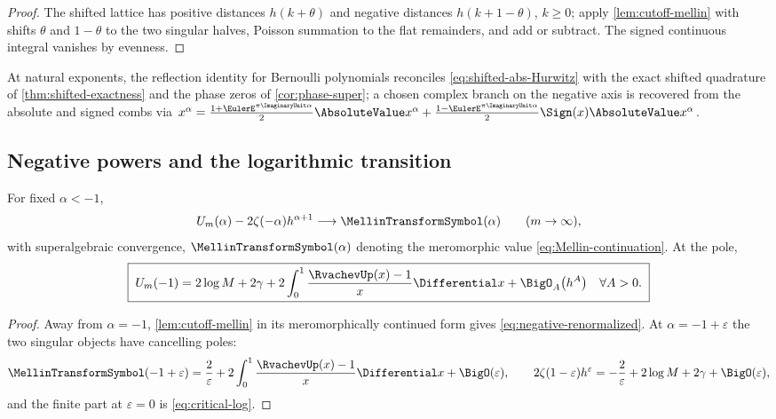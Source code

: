 \documentclass[11pt,oneside]{article}
\numberwithin{equation}{section}
\theoremstyle{definition}
\theoremstyle{remark}
\newcommand{\eps}{\varepsilon}
\begin{document}
\begin{proof}
The shifted lattice has positive distances $h(k+\theta)$ and negative
distances $h(k+1-\theta)$, $k\ge0$; apply \cref{lem:cutoff-mellin}
with shifts $\theta$ and $1-\theta$ to the two singular halves,
Poisson summation to the flat remainders, and add or subtract.  The
signed continuous integral vanishes by evenness.
\end{proof}

At natural exponents, the reflection identity for Bernoulli
polynomials reconciles \eqref{eq:shifted-abs-Hurwitz} with the exact
shifted quadrature of \cref{thm:shifted-exactness} and the phase
zeros of \cref{cor:phase-super}; a chosen complex branch on the
negative axis is recovered from the absolute and signed combs via
$x^{\alpha}
=\tfrac{1+\EulerE^{\pi\ImaginaryUnit\alpha}}2\AbsoluteValue x^{\alpha}
+\tfrac{1-\EulerE^{\pi\ImaginaryUnit\alpha}}2\Sign(x)\AbsoluteValue x^{\alpha}$.

\subsection{Negative powers and the logarithmic transition}

\begin{proposition}
\label{prop:negative-powers}
For fixed $\alpha<-1$,
\begin{equation}
 U_m(\alpha)-2\zeta(-\alpha)h^{\alpha+1}
 \longrightarrow \MellinTransformSymbol(\alpha)
 \qquad(m\to\infty),
 \label{eq:negative-renormalized}
\end{equation}
with superalgebraic convergence, $\MellinTransformSymbol(\alpha)$ denoting the
meromorphic value \eqref{eq:Mellin-continuation}.  At the pole,
\begin{equation}
 \boxed{\;
 U_m(-1)
 =2\log M+2\gamma
 +2\int_0^1\frac{\RvachevUp(x)-1}{x}\Differential x
 +\BigO_A\bigl(h^{A}\bigr)
 \quad\forall A>0.
 \;}
 \label{eq:critical-log}
\end{equation}
\end{proposition}

\begin{proof}
Away from $\alpha=-1$, \cref{lem:cutoff-mellin} in its meromorphically
continued form gives \eqref{eq:negative-renormalized}.  At
$\alpha=-1+\eps$ the two singular objects have cancelling poles:
\[
 \MellinTransformSymbol(-1+\eps)=\frac2\eps
 +2\int_0^1\frac{\RvachevUp(x)-1}{x}\Differential x+\BigO(\eps),
 \qquad
 2\zeta(1-\eps)h^{\eps}
 =-\frac2\eps+2\log M+2\gamma+\BigO(\eps),
\]
and the finite part at $\eps=0$ is \eqref{eq:critical-log}.
\end{proof}
\end{document}
